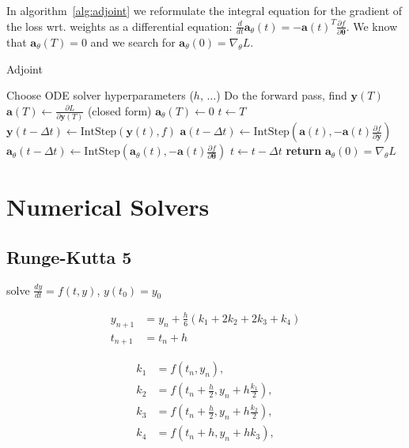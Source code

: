 \documentclass{article}
\begin{document}
    In algorithm~\ref{alg:adjoint} we reformulate the integral equation for the gradient of the loss wrt.
    weights as a differential equation: $ \frac{d}{dt} \pmb{a}_\theta(t) = -\pmb{a}(t)^T \frac{\partial f}{\partial \pmb{\theta}}$.
    We know that $\pmb{a}_\theta(T) = 0$ and we search for $\pmb{a}_\theta(0) = \nabla_\theta L$.

    \begin{algorithm}
        \caption{Adjoint}
        \label{alg:adjoint}
        \begin{algorithmic}
            \State Choose ODE solver hyperparameters ($h$, $\dots$)
            \State Do the forward pass, find $\pmb{y}(T)$
            \State $\pmb{a}(T) \gets \frac{\partial L}{\partial \pmb{y}(T)}$ (closed form)
            \State $\pmb{a}_{\theta}(T) \gets 0$
            \State $t \gets T$
                \State $\pmb{y}(t - \Delta t) \gets \text{IntStep}(\pmb{y}(t), f) $
                \State $\pmb{a}(t - \Delta t) \gets \text{IntStep}(
                \pmb{a}(t), -\pmb{a}(t) \frac{\partial f }{\partial \pmb{y}}
                )$
                \State $\pmb{a}_{\theta}(t - \Delta t) \gets \text{IntStep}(
                \pmb{a}_{\theta}(t), -\pmb{a}(t) \frac{\partial f }{\partial \pmb{\theta}}
                )$
                \State $t \gets t - \Delta t$
            \EndWhile
            \State \textbf{return} $\pmb{a}_\theta(0) = \nabla_\theta L$
        \end{algorithmic}
    \end{algorithm}


    \section{Numerical Solvers}

    \subsection{Runge-Kutta 5}

    solve $\frac{dy}{dt} = f(t,y)$, $y(t_0) = y_0 $

    \begin{align*}
        y_{n+1} &= y_n + \frac{h}{6}(k_1 + 2k_2 +2k_3 + k_4)  \\
        t_{n+1} &= t_n + h
    \end{align*}

    \begin{align*}
        k_{1} &= f(t_{n}, y_{n}), \\
        k_{2} &= f(t_{n} + \frac{h}{2}, y_{n} + h \frac{ k_{1} }{ 2 } ),    \\
        k_{3} &= f(t_{n} + \frac{h}{2}, y_{n} + h \frac{ k_{2} }{ 2 } ),  \\
        k_{4} &= f(t_{n} + h, y_{n} + hk_3), \\
    \end{align*}
\end{document}
